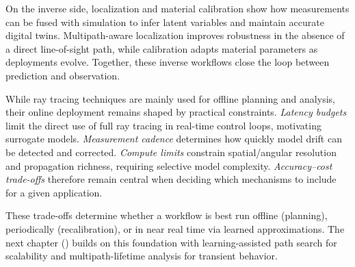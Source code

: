 On the inverse side, localization and material calibration show how measurements can be fused with simulation to infer latent variables and maintain accurate digital twins. Multipath-aware localization improves robustness in the absence of a direct \gls{line-of-sight} path, while calibration adapts material parameters as deployments evolve. Together, these inverse workflows close the loop between prediction and observation.

While ray tracing techniques are mainly used for offline planning and analysis, their online deployment remains shaped by practical constraints. \emph{Latency budgets} limit the direct use of full ray tracing in real-time control loops, motivating surrogate models. \emph{Measurement cadence} determines how quickly model drift can be detected and corrected. \emph{Compute limits} constrain spatial/angular resolution and propagation richness, requiring selective model complexity. \emph{Accuracy--cost trade-offs} therefore remain central when deciding which mechanisms to include for a given application.

These trade-offs determine whether a workflow is best run offline (planning), periodically (recalibration), or in near real time via learned approximations. The next chapter () builds on this foundation with learning-assisted path search for scalability and multipath-lifetime analysis for transient behavior.

